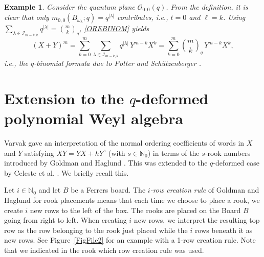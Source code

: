 \documentclass[10pt]{amsart}
\newtheorem{example}[theorem]{Example}%
\begin{document}
\begin{example} Consider the quantum plane ${\mathcal O}_{0,0}(q)$. From the definition, it is clear that only $m_{0,0}(B_{\omega_{\lambda}};q)=q^{|\lambda |}$ contributes, i.e., $t=0$ and $\ell = k$. Using $\sum_{\lambda \in \mathcal{I}_{m-k,k}}q^{|\lambda|}=\binom{m}{k}_q $, \eqref{OREBINOM} yields 
$$
(X+Y)^m=\sum_{k=0}^m  \sum_{\lambda \in \mathcal{I}_{m-k,k}}q^{|\lambda|} \, Y^{m-k}X^{k}=\sum_{k=0}^m \binom{m}{k}_q \, Y^{m-k}X^{k},
$$
i.e., the $q$-binomial formula due to Potter \cite{HP1950} and Schützenberger \cite{MS1953}.
\end{example}

\section{Extension to the $q$-deformed polynomial Weyl algebra}\label{Polynomial}
Varvak \cite{AV2005} gave an interpretation of the normal ordering coefficients of words in $X$ and $Y$ satisfying $XY=YX+hY^s$ (with $s\in \mathbb{N}_0$) in terms of the $s$-rook numbers introduced by Goldman and Haglund \cite{JGJH2000}. This was extended to the $q$-deformed case by Celeste et al. \cite{CCG2017}. We briefly recall this.

Let $i\in \mathbb{N}_0$ and let $B$ be a Ferrers board. The {\em $i$-row creation rule} of Goldman and Haglund \cite{JGJH2000} for rook placements means that each time we choose to place a rook, we create $i$ new rows to the left of the box. The rooks are placed on the Board $B$ going from right to left. When creating $i$ new rows, we interpret the resulting top row as the row belonging to the rook just placed while the $i$ rows beneath it as new rows. See Figure~\ref{FigFile2} for an example with a 1-row creation rule. Note that we indicated in the rook which row creation rule was used.
\end{document}
